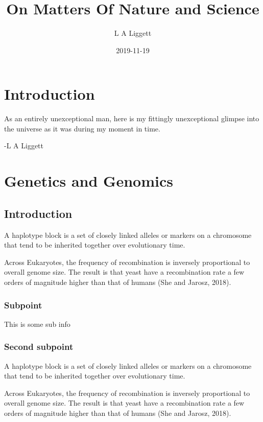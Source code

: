 \documentclass[]{book}
\title{On Matters Of Nature and Science}
\author{L A Liggett}
\date{2019-11-19}
\begin{document}
\maketitle

{
\setcounter{tocdepth}{1}
\tableofcontents
}
\hypertarget{introduction}{%
\chapter{Introduction}\label{introduction}}

As an entirely unexceptional man, here is my fittingly unexceptional glimpse into the universe as it was during my moment in time.

-L A Liggett

\hypertarget{g2}{%
\chapter{Genetics and Genomics}\label{g2}}

\hypertarget{introduction-1}{%
\section{Introduction}\label{introduction-1}}

A haplotype block is a set of closely linked alleles or markers on a chromosome that tend to be inherited together over evolutionary time.

Across Eukaryotes, the frequency of recombination is inversely proportional to overall genome size. The result is that yeast have a recombination rate a few orders of magnitude higher than that of humans (She and Jarosz, 2018).

\hypertarget{subpoint}{%
\subsection{Subpoint}\label{subpoint}}

This is some sub info

\hypertarget{second-subpoint}{%
\subsection{Second subpoint}\label{second-subpoint}}

A haplotype block is a set of closely linked alleles or markers on a chromosome that tend to be inherited together over evolutionary time.

Across Eukaryotes, the frequency of recombination is inversely proportional to overall genome size. The result is that yeast have a recombination rate a few orders of magnitude higher than that of humans (She and Jarosz, 2018).
\end{document}
